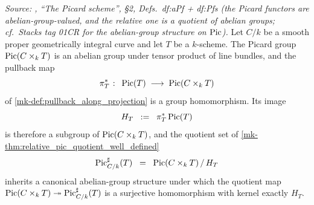 \begin{lemma}\label{mk-lem:rel_pic_sharp_groupoid}
  \leanok

  \textit{Source: \cite{kleiman-picard}, ``The Picard scheme'', \S 2,
  Defs.~df:aPf + df:Pfs (the Picard functors are abelian-group-valued, and the
  relative one is a quotient of abelian groups; cf.\ Stacks tag 01CR for the
  abelian-group structure on \(\operatorname{Pic}\)).}
  Let \(C/k\) be a smooth proper geometrically integral curve and let \(T\) be a
  \(k\)-scheme. The Picard group \(\operatorname{Pic}(C \times_k T)\) is an abelian group under
  tensor product of line bundles, and the pullback map
  \[
    \pi_T^* \;\colon\; \operatorname{Pic}(T) \;\longrightarrow\; \operatorname{Pic}(C \times_k T)
  \]
  of \ref{mk-def:pullback_along_projection} is a group homomorphism. Its image
  \[
    H_T \;\;:=\;\; \pi_T^* \operatorname{Pic}(T)
  \]
  is therefore a subgroup of \(\operatorname{Pic}(C \times_k T)\), and the quotient set of
  \ref{mk-thm:relative_pic_quotient_well_defined}
  \[
    \operatorname{Pic}^\sharp_{C/k}(T) \;\;=\;\; \operatorname{Pic}(C \times_k T) \, / \, H_T
  \]
  inherits a canonical abelian-group structure under which the quotient map
  \(\operatorname{Pic}(C \times_k T) \twoheadrightarrow \operatorname{Pic}^\sharp_{C/k}(T)\) is a surjective
  homomorphism with kernel exactly \(H_T\).
\end{lemma}
